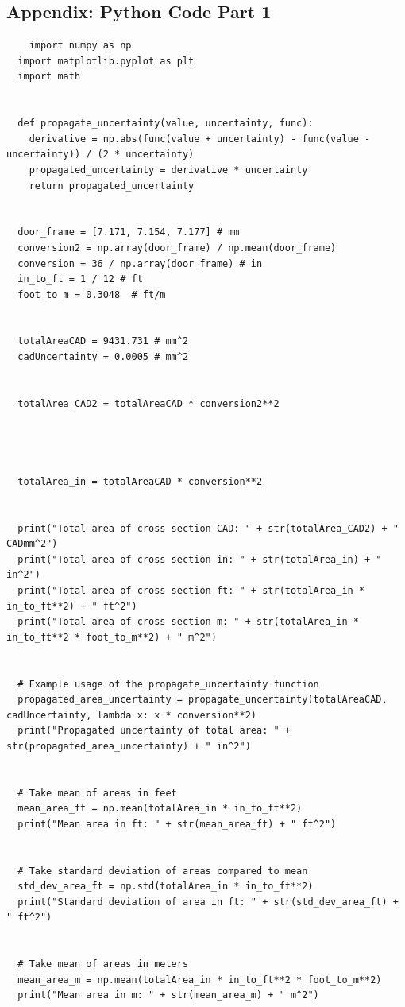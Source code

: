 \documentclass{article}
\begin{document}
\newpage
\begin{appendices}
\pagestyle{fancy}
\renewcommand{\thefigure}{A\arabic{figure}}
\setcounter{figure}{0}

\newpage
\section*{Appendix: Python Code Part 1}


\begin{verbatim}
	import numpy as np
  import matplotlib.pyplot as plt
  import math


  def propagate_uncertainty(value, uncertainty, func):
  	derivative = np.abs(func(value + uncertainty) - func(value - uncertainty)) / (2 * uncertainty)
  	propagated_uncertainty = derivative * uncertainty
  	return propagated_uncertainty


  door_frame = [7.171, 7.154, 7.177] # mm
  conversion2 = np.array(door_frame) / np.mean(door_frame)
  conversion = 36 / np.array(door_frame) # in
  in_to_ft = 1 / 12 # ft
  foot_to_m = 0.3048  # ft/m


  totalAreaCAD = 9431.731 # mm^2
  cadUncertainty = 0.0005 # mm^2


  totalArea_CAD2 = totalAreaCAD * conversion2**2




  totalArea_in = totalAreaCAD * conversion**2


  print("Total area of cross section CAD: " + str(totalArea_CAD2) + " CADmm^2")
  print("Total area of cross section in: " + str(totalArea_in) + " in^2")
  print("Total area of cross section ft: " + str(totalArea_in * in_to_ft**2) + " ft^2")
  print("Total area of cross section m: " + str(totalArea_in * in_to_ft**2 * foot_to_m**2) + " m^2")


  # Example usage of the propagate_uncertainty function
  propagated_area_uncertainty = propagate_uncertainty(totalAreaCAD, cadUncertainty, lambda x: x * conversion**2)
  print("Propagated uncertainty of total area: " + str(propagated_area_uncertainty) + " in^2")


  # Take mean of areas in feet
  mean_area_ft = np.mean(totalArea_in * in_to_ft**2)
  print("Mean area in ft: " + str(mean_area_ft) + " ft^2")


  # Take standard deviation of areas compared to mean
  std_dev_area_ft = np.std(totalArea_in * in_to_ft**2)
  print("Standard deviation of area in ft: " + str(std_dev_area_ft) + " ft^2")


  # Take mean of areas in meters
  mean_area_m = np.mean(totalArea_in * in_to_ft**2 * foot_to_m**2)
  print("Mean area in m: " + str(mean_area_m) + " m^2")



\end{verbatim}
\end{appendices}
\end{document}
